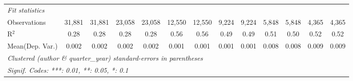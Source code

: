\begin{tabular}{lcccccccccccc}
   \midrule
   \emph{Fit statistics}\\
   Observations                             & 31,881        & 31,881         & 23,058       & 23,058         & 12,550       & 12,550        & 9,224        & 9,224         & 5,848   & 5,848    & 4,365   & 4,365\\  
   R$^2$                                    & 0.28          & 0.28           & 0.28         & 0.28           & 0.56         & 0.56          & 0.49         & 0.49          & 0.51    & 0.50     & 0.52    & 0.52\\  
Mean(Dep. Var.) & 0.002 & 0.002 & 0.002 & 0.002 & 0.001 & 0.001 & 0.001 & 0.001 & 0.008 & 0.008 & 0.009 & 0.009 \\
   \midrule \midrule
   \multicolumn{13}{l}{\emph{Clustered (author \& quarter\_year) standard-errors in parentheses}}\\
   \multicolumn{13}{l}{\emph{Signif. Codes: ***: 0.01, **: 0.05, *: 0.1}}\\
\end{tabular}
\par\endgroup
